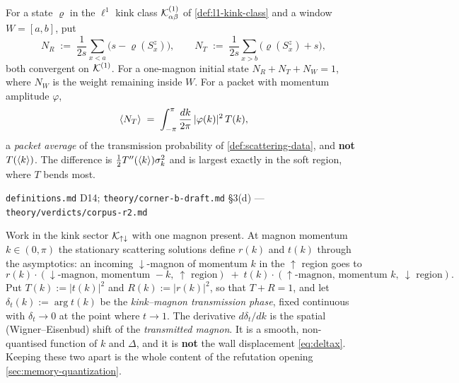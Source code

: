 \begin{definition}
\label{def:leg-content}
For a state $\varrho$ in the $\ell^1$ kink class $\mathcal{K}^{(1)}_{\alpha\beta}$ of
\cref{def:l1-kink-class} and a window $W=[a,b]$, put
\begin{equation}
  N_R\;:=\;\frac{1}{2s}\sum_{x<a}\bigl(s-\varrho(S^z_x)\bigr),
  \qquad
  N_T\;:=\;\frac{1}{2s}\sum_{x>b}\bigl(\varrho(S^z_x)+s\bigr),
  \label{eq:legs}
\end{equation}
both convergent on $\mathcal{K}^{(1)}$. For a one-magnon initial state
$N_R+N_T+N_W=1$, where $N_W$ is the weight remaining inside $W$. For a packet
with momentum amplitude $\varphi$,
\begin{equation}
  \langle N_T\rangle\;=\;\int_{-\pi}^{\pi}\frac{dk}{2\pi}\,|\varphi(k)|^2\,T(k),
  \label{eq:packet-average}
\end{equation}
a \emph{packet average} of the transmission probability of
\cref{def:scattering-data}, and \textbf{not} $T(\langle k\rangle)$. The difference is
$\tfrac12T''(\langle k\rangle)\sigma_k^2$ and is largest exactly in the soft region,
where $T$ bends most.
\end{definition}

%
{\texttt{definitions.md} D14; \texttt{theory/corner-b-draft.md} \S3(d)}%
{---}%
{\texttt{theory/verdicts/corpus-r2.md}}

\begin{definition}
\label{def:scattering-data}
Work in the kink sector $\mathcal{K}_{\uparrow\downarrow}$ with one magnon present. At
magnon momentum $k\in(0,\pi)$ the stationary scattering solutions define
$r(k)$ and $t(k)$ through the asymptotics: an incoming $\downarrow$-magnon of
momentum $k$ in the $\uparrow$ region goes to
\[
  r(k)\cdot(\downarrow\text{-magnon, momentum }-k,\ \uparrow\text{ region})
  \;+\;t(k)\cdot(\uparrow\text{-magnon, momentum }k,\ \downarrow\text{ region}).
\]
Put $T(k):=|t(k)|^2$ and $R(k):=|r(k)|^2$, so that $T+R=1$, and let
$\delta_t(k):=\arg t(k)$ be the \emph{kink--magnon transmission phase}, fixed
continuous with $\delta_t\to0$ at the point where $t\to1$. The derivative
$d\delta_t/dk$ is the spatial (Wigner--Eisenbud) shift of the \emph{transmitted
magnon}. It is a smooth, non-quantised function of $k$ and $\Delta$, and it is
\textbf{not} the wall displacement \eqref{eq:deltax}. Keeping these two apart is
the whole content of the refutation opening
\cref{sec:memory-quantization}.
\end{definition}

